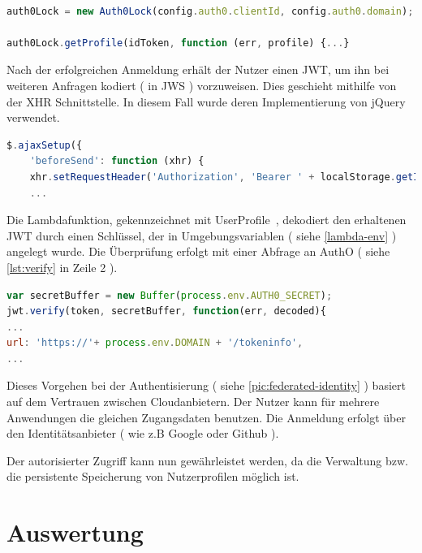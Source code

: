 \documentclass[
12pt,
english,
ngerman,
headsepline,
twoside,
openright,
numbers=noenddot,version=first
]{scrreprt}
\begin{document}
\begin{lstlisting}[language=JavaScript,caption={Auth0 Anmeldung},label={lst:authO-anmeldung}]

auth0Lock = new Auth0Lock(config.auth0.clientId, config.auth0.domain);

auth0Lock.getProfile(idToken, function (err, profile) {...}

\end{lstlisting}
Nach der erfolgreichen Anmeldung erhält der Nutzer einen \acrfull{JWT}, um ihn bei weiteren Anfragen kodiert ( in \acrfull{JWS} ) vorzuweisen. Dies geschieht mithilfe von der \acrfull{XHR} Schnittstelle. In diesem Fall wurde deren Implementierung von jQuery verwendet.

\begin{lstlisting}[language=JavaScript,caption={Remote Procedure Call mit XHR Schnittstelle},label={lst:xhr}]
$.ajaxSetup({
	'beforeSend': function (xhr) {
	xhr.setRequestHeader('Authorization', 'Bearer ' + localStorage.getItem('userToken'));
	...
\end{lstlisting}

Die Lambdafunktion, gekennzeichnet mit \glqq UserProfile\grqq\ , dekodiert den erhaltenen \acrshort{JWT} durch einen Schlüssel, der in Umgebungsvariablen ( siehe \autoref{lambda-env} ) angelegt wurde. Die Überprüfung erfolgt mit einer Abfrage an AuthO ( siehe \autoref{lst:verify} in Zeile 2 ).

\begin{lstlisting}[language=JavaScript,caption={Authentisierung in Lambda},label={lst:verify}]
var secretBuffer = new Buffer(process.env.AUTH0_SECRET);
jwt.verify(token, secretBuffer, function(err, decoded){
...
url: 'https://'+ process.env.DOMAIN + '/tokeninfo',
...
\end{lstlisting}

Dieses Vorgehen bei der Authentisierung ( siehe \autoref{pic:federated-identity} ) basiert auf dem Vertrauen zwischen Cloudanbietern. Der Nutzer kann für mehrere Anwendungen die gleichen Zugangsdaten benutzen. Die Anmeldung erfolgt über den Identitätsanbieter ( wie z.B Google oder Github ). 

Der autorisierter Zugriff kann nun gewährleistet werden, da die Verwaltung bzw. die persistente Speicherung von Nutzerprofilen möglich ist. 

\chapter{Auswertung}
\end{document}
